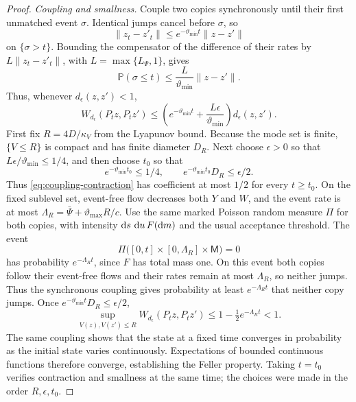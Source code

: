 \begin{proof}
\emph{Coupling and smallness.} Couple two copies synchronously until their first unmatched event \(\sigma\). Identical jumps cancel before \(\sigma\), so
\[
\|z_t-z'_t\|\leq e^{-\vartheta_{\min}t}\|z-z'\|
\]
on \(\{\sigma>t\}\). Bounding the compensator of the difference of their rates by \(L\|z_t-z'_t\|\), with \(L=\max\{L_\Psi,1\}\), gives
\[
\mathbb P(\sigma\leq t)\leq
\frac{L}{\vartheta_{\min}}\|z-z'\|.
\]
Thus, whenever \(d_\epsilon(z,z')<1\),
\begin{equation}\label{eq:coupling-contraction}
W_{d_\epsilon}(P_tz,P_tz')
\leq\left(e^{-\vartheta_{\min}t}
+\frac{L\epsilon}{\vartheta_{\min}}\right)d_\epsilon(z,z').
\end{equation}
First fix \(R=4D/\kappa_V\) from the Lyapunov bound. Because the mode set is finite, \(\{V\leq R\}\) is compact and has finite diameter \(D_R\). Next choose \(\epsilon>0\) so that \(L\epsilon/\vartheta_{\min}\leq1/4\), and then choose \(t_0\) so that
\[
e^{-\vartheta_{\min}t_0}\leq1/4,
\qquad e^{-\vartheta_{\min}t_0}D_R\leq\epsilon/2.
\]
Thus \eqref{eq:coupling-contraction} has coefficient at most \(1/2\) for every \(t\geq t_0\). On the fixed sublevel set, event-free flow decreases both \(Y\) and \(W\), and the event rate is at most \(\Lambda_R=\bar\Psi+\vartheta_{\max}R/c\).
Use the same marked Poisson random measure $\Pi$ for both
copies, with intensity $\mathop{}\!\mathrm{d} s\,\mathop{}\!\mathrm{d} u\,F(\mathop{}\!\mathrm{d} m)$ and the
usual acceptance threshold. The event
\[
 \Pi\bigl([0,t]\times[0,\Lambda_R]\times\mathsf M\bigr)=0
\]
has probability $e^{-\Lambda_Rt}$, since $F$ has total mass one. On this
event both copies follow their event-free flows and their rates remain at
most $\Lambda_R$, so neither jumps. Thus the synchronous coupling gives probability at least $e^{-\Lambda_Rt}$ that neither copy jumps. Once \(e^{-\vartheta_{\min}t}D_R\leq\epsilon/2\),
\[
\sup_{V(z),V(z')\leq R}W_{d_\epsilon}(P_tz,P_tz')
\leq1-\tfrac12e^{-\Lambda_Rt}<1.
\]
The same coupling shows that the state at a fixed time converges in probability as the initial state varies continuously. Expectations of bounded continuous functions therefore converge, establishing the Feller property. Taking \(t=t_0\) verifies contraction and smallness at the same time; the choices were made in the order \(R,\epsilon,t_0\).


\end{proof}

